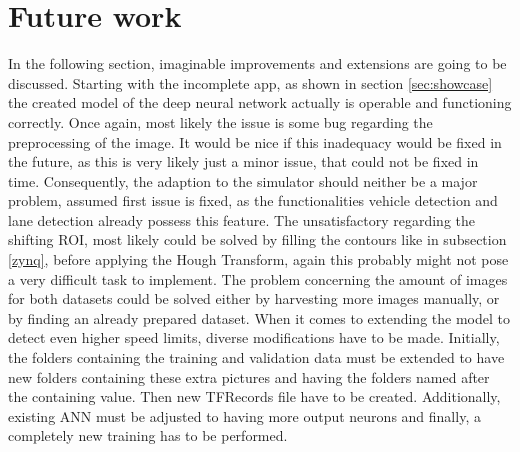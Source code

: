 
\chapter{Future work}\label{chapter:futurework}
In the following section, imaginable improvements and extensions are going to be discussed.\newline 
Starting with the incomplete app, as shown in section \ref{sec:showcase} the created model of the deep neural network actually is operable and functioning correctly. Once again, most likely the issue is some bug regarding the preprocessing of the image. It would be nice if this inadequacy would be fixed in the future, as this is very likely just a minor issue, that could not be fixed in time. \newline
Consequently, the adaption to the simulator should neither be a major problem, assumed first issue is fixed, as the functionalities vehicle detection and lane detection already possess this feature. \newline
The unsatisfactory regarding the shifting ROI, most likely could be solved by filling the contours like in subsection \ref{zynq}, before applying the Hough Transform, again this probably might not pose a very difficult task to implement. \newline
The problem concerning the amount of images for both datasets could be solved either by harvesting more images manually, or by finding an already prepared dataset. When it comes to extending the model to detect even higher speed limits, diverse modifications have to be made. Initially, the folders containing the training and validation data must be extended to have new folders containing these extra pictures and having the folders named after the containing value. Then new TFRecords file have to be created. Additionally,  existing ANN must be adjusted to having more output neurons and finally, a completely new training has to be performed.\newline


